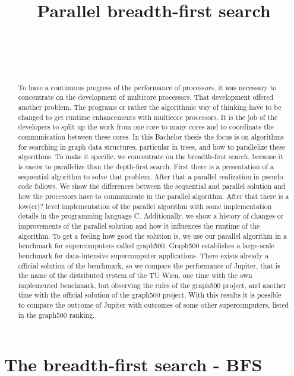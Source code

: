 \documentclass[12pt,a4paper]{article}
\title{Parallel breadth-first search}
\author{
 \authorname{Alexander Gallauner} \\
 \studentnumber{1026090} \\
 \curriculum{534} \\
 \email{alexander.gallauner@gmail.com}
}
\begin{document}
\maketitle
\begin{abstract}
To have a continuous progress of the performance of processors, it was necessary to concentrate on the development of multicore processors. That development offered another problem. The programs or rather the algorithmic way of thinking have to be changed to get runtime enhancements with multicore processors. It is the job of the developers to split up the work from one core to many cores and to coordinate the communication between these cores. In this Bachelor thesis the focus is on algorithms for searching in graph data structures, particular in trees, and how to parallelize these algorithms. To make it specific, we concentrate on the breadth-first search, because it is easier to parallelize than the depth-first search. First there is a presentation of a sequential algorithm to solve that problem. After that a parallel realization in pseudo code follows. We show the differences between the sequential and parallel solution and how the processors have to communicate in the parallel algorithm. After that there is a low(er)? level implementation of the parallel algorithm with some implementation details in the programming language C. Additionally, we show a history of changes or improvements of the parallel solution and how it influences the runtime of the algorithm.
To get a feeling how good the solution is, we use our parallel algorithm in a benchmark for supercomputers called graph500. Graph500 establishes a large-scale benchmark for data-intensive supercomputer applications. There exists already a official solution of the benchmark, so we compare the performance of Jupiter, that is the name of the distributed system of the TU Wien, one time with the own implemented benchmark, but observing the rules of the graph500 project, and another time with the official solution of the graph500 project. With this results it is possible to compare the outcome of Jupiter with outcomes of some other supercomputers, listed in the graph500 ranking.
\end{abstract}

\clearpage

\section{The breadth-first search - BFS}
\label{sec:breadth-first search}
\end{document}
